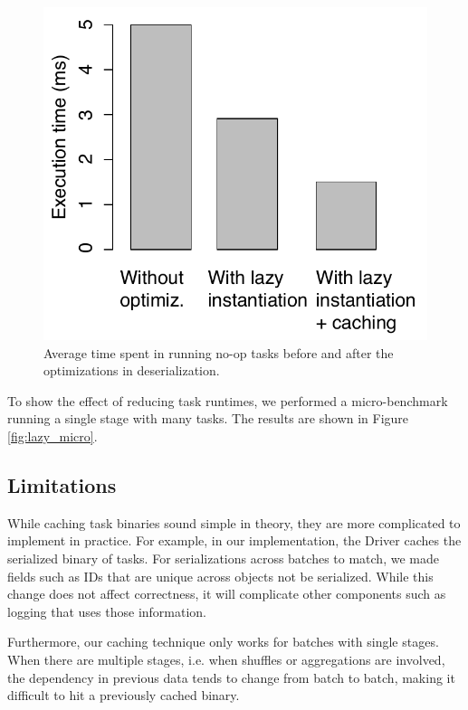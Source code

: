 \begin{figure}[t!]
 \begin{center}
   \includegraphics[scale=0.60]{images_graphs/optimizations/graph3/runtime_optimizations.pdf}
 \end{center}
 \caption{Average time spent in running no-op tasks before and after the optimizations in deserialization.}
 \label{fig:runtime_optimizations}
\end{figure}

To show the effect of reducing task runtimes, we performed a micro-benchmark running a single stage with many tasks. The results are shown in Figure \ref{fig:lazy_micro}.


\subsection{Limitations}
While caching task binaries sound simple in theory, they are more complicated to implement in practice. For example, in our implementation, the Driver caches the serialized binary of tasks. For serializations across batches to match, we made fields such as IDs that are unique across objects not be serialized. While this change does not affect correctness, it will complicate other components such as logging that uses those information.

Furthermore, our caching technique only works for batches with single stages. When there are multiple stages, i.e. when shuffles or aggregations are involved, the dependency in previous data tends to change from batch to batch, making it difficult to hit a previously cached binary.

